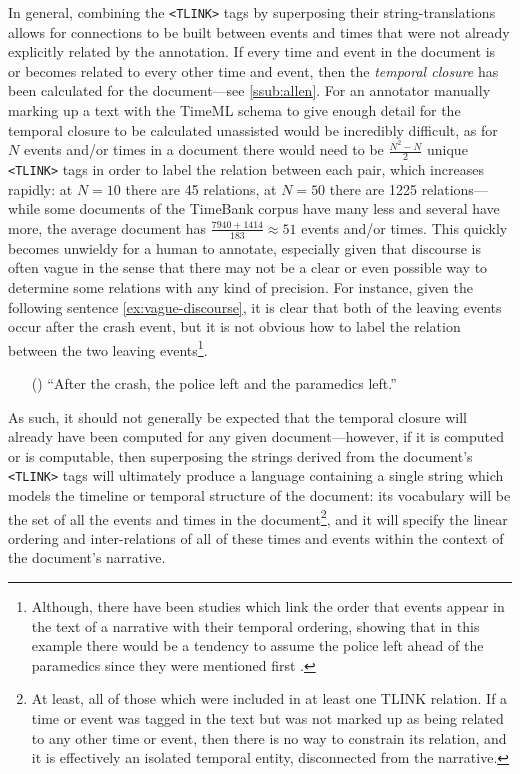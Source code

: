 \documentclass[a4paper,12pt,leqno,twoside]{article}
\newcommand{\ipp}{(\refstepcounter{equation}\theequation)}
\begin{document}
In general, combining the \verb|<TLINK>| tags by superposing their string-translations allows for connections to be built between events and times that were not already explicitly related by the annotation. If every time and event in the document is or becomes related to every other time and event, then the \textit{temporal closure} has been calculated for the document---see \cref{ssub:allen}. For an annotator manually marking up a text with the TimeML schema to give enough detail for the temporal closure to be calculated unassisted would be incredibly difficult, as for $N$ events and/or times in a document there would need to be $\frac{N^2 - N}{2}$ unique \verb|<TLINK>| tags in order to label the relation between each pair, which increases rapidly: at $N = 10$ there are 45 relations, at $N = 50$ there are 1225 relations---while some documents of the TimeBank corpus have many less and several have more, the average document has $\frac{7940+1414}{183} \approx 51$ events and/or times. This quickly becomes unwieldy for a human to annotate, especially given that discourse is often vague in the sense that there may not be a clear or even possible way to determine some relations with any kind of precision. For instance, given the following sentence \cref{ex:vague-discourse}, it is clear that both of the leaving events occur after the crash event, but it is not obvious how to label the relation between the two leaving events\footnote{Although, there have been studies which link the order that events appear in the text of a narrative with their temporal ordering, showing that in this example there would be a tendency to assume the police left ahead of the paramedics since they were mentioned first \citep{ohtsuka1992discourse}.}.
\begin{itemize}
	\item[\ipp\label{ex:vague-discourse}] ``After the crash, the police left and the paramedics left.''
\end{itemize}
As such, it should not generally be expected that the temporal closure will already have been computed for any given document---however, if it is computed or is computable, then superposing the strings derived from the document's \verb|<TLINK>| tags will ultimately produce a language containing a single string which models the timeline or temporal structure of the document: its vocabulary will be the set of all the events and times in the document\footnote{At least, all of those which were included in at least one TLINK relation. If a time or event was tagged in the text but was not marked up as being related to any other time or event, then there is no way to constrain its relation, and it is effectively an isolated temporal entity, disconnected from the narrative.}, and it will specify the linear ordering and inter-relations of all of these times and events within the context of the document's narrative.
\end{document}
